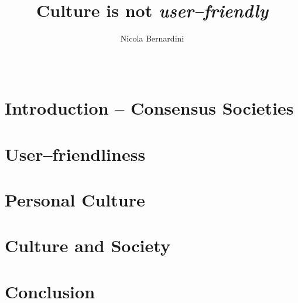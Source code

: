 \documentclass{scrartcl}
\title{Culture is not \emph{user--friendly}}
\author{Nicola Bernardini}
\date{~}
\begin{document}
\maketitle

\section{Introduction -- Consensus Societies}

\section{User--friendliness}

\section{Personal Culture}

\section{Culture and Society}

\section{Conclusion}
\end{document}
